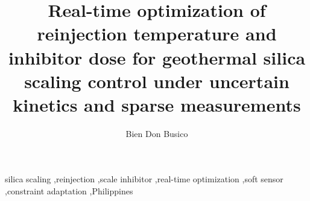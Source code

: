 \documentclass[review,authoryear]{elsarticle}
\begin{document}
\begin{frontmatter}

\title{Real-time optimization of reinjection temperature and inhibitor
dose for geothermal silica scaling control under uncertain kinetics and
sparse measurements}

\author[upd]{Bien Don Busico}

\begin{abstract}

\end{abstract}

\begin{keyword}
silica scaling \sep reinjection \sep scale inhibitor \sep real-time
optimization \sep soft sensor \sep constraint adaptation \sep Philippines
\end{keyword}

\end{frontmatter}








\appendix






\end{document}
